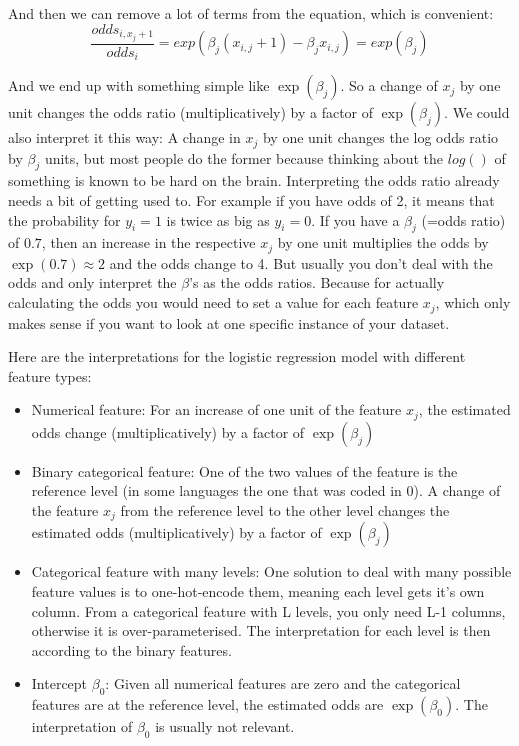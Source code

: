 \documentclass[12pt,]{krantz}
\providecommand{\tightlist}{%
  \setlength{\itemsep}{0pt}\setlength{\parskip}{0pt}}
\theoremstyle{definition}
\theoremstyle{definition}
\theoremstyle{definition}
\theoremstyle{remark}
\begin{document}
And then we can remove a lot of terms from the equation, which is
convenient:
\[ \frac{odds_{i, x_j + 1}}{odds_i}=  exp\left( \beta_{j} (x_{i,j} + 1) - \beta_{j} x_{i,j} \right) = exp\left(\beta_j\right)\]

And we end up with something simple like \(\exp(\beta_j)\). So a change
of \(x_j\) by one unit changes the odds ratio (multiplicatively) by a
factor of \(\exp(\beta_j)\). We could also interpret it this way: A
change in \(x_j\) by one unit changes the log odds ratio by \(\beta_j\)
units, but most people do the former because thinking about the
\(log()\) of something is known to be hard on the brain. Interpreting
the odds ratio already needs a bit of getting used to. For example if
you have odds of 2, it means that the probability for \(y_i = 1\) is
twice as big as \(y_i = 0\). If you have a \(\beta_j\) (=odds ratio) of
\(0.7\), then an increase in the respective \(x_j\) by one unit
multiplies the odds by \(\exp(0.7) \approx 2\) and the odds change to 4.
But usually you don't deal with the odds and only interpret the
\(\beta\)'s as the odds ratios. Because for actually calculating the
odds you would need to set a value for each feature \(x_j\), which only
makes sense if you want to look at one specific instance of your
dataset.

Here are the interpretations for the logistic regression model with
different feature types:

\begin{itemize}
\tightlist
\item
  Numerical feature: For an increase of one unit of the feature
  \(x_{j}\), the estimated odds change (multiplicatively) by a factor of
  \(\exp(\beta_{j})\)
\item
  Binary categorical feature: One of the two values of the feature is
  the reference level (in some languages the one that was coded in 0). A
  change of the feature \(x_{j}\) from the reference level to the other
  level changes the estimated odds (multiplicatively) by a factor of
  \(\exp(\beta_{j})\)
\item
  Categorical feature with many levels: One solution to deal with many
  possible feature values is to one-hot-encode them, meaning each level
  gets it's own column. From a categorical feature with L levels, you
  only need L-1 columns, otherwise it is over-parameterised. The
  interpretation for each level is then according to the binary
  features.
\item
  Intercept \(\beta_{0}\): Given all numerical features are zero and the
  categorical features are at the reference level, the estimated odds
  are \(\exp(\beta_{0})\). The interpretation of \(\beta_{0}\) is
  usually not relevant.
\end{itemize}
\end{document}
